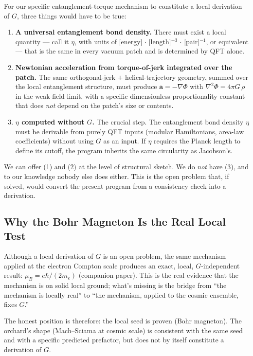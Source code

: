 \documentclass[11pt,letterpaper]{article}
\begin{document}
For our specific entanglement-torque mechanism to constitute a local
derivation of $G$, three things would have to be true:

\begin{enumerate}
  \item \textbf{A universal entanglement bond density.} There must
    exist a local quantity --- call it $\eta$, with units of
    [energy] $\cdot$ [length]$^{-3}$ $\cdot$ [pair]$^{-1}$, or
    equivalent --- that is the same in every vacuum patch and is
    determined by QFT alone.
  \item \textbf{Newtonian acceleration from torque-of-jerk integrated
    over the patch.} The same orthogonal-jerk $+$ helical-trajectory
    geometry, summed over the local entanglement structure, must
    produce $\mathbf{a} = -\nabla\Phi$ with $\nabla^2 \Phi = 4\pi G\,
    \rho$ in the weak-field limit, with a specific dimensionless
    proportionality constant that does \emph{not} depend on the
    patch's size or contents.
  \item \textbf{$\eta$ computed without $G$.} The crucial step. The
    entanglement bond density $\eta$ must be derivable from purely
    QFT inputs (modular Hamiltonians, area-law coefficients) without
    using $G$ as an input. If $\eta$ requires the Planck length to
    define its cutoff, the program inherits the same circularity as
    Jacobson's.
\end{enumerate}

We can offer (1) and (2) at the level of structural sketch. We do
\emph{not} have (3), and to our knowledge nobody else does either.
This is the open problem that, if solved, would convert the present
program from a consistency check into a derivation.

\subsection{Why the Bohr Magneton Is the Real Local Test}

Although a local derivation of $G$ is an open problem, the same
mechanism applied at the electron Compton scale produces an exact,
local, $G$-independent result: $\mu_B = e\hbar/(2 m_e)$ (companion
paper). This is the real evidence that the mechanism is on solid
local ground; what's missing is the bridge from ``the mechanism is
locally real'' to ``the mechanism, applied to the cosmic ensemble,
fixes $G$.''

The honest position is therefore: the local seed is proven (Bohr
magneton). The orchard's shape (Mach--Sciama at cosmic scale) is
consistent with the same seed and with a specific predicted
prefactor, but does not by itself constitute a derivation of $G$.
\end{document}
